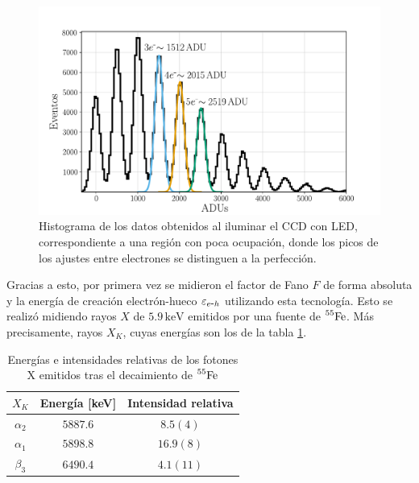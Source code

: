 \begin{figure}[H]
    \centering
        \includegraphics[scale=.5]{Figs/ajuste_gaussiano_calibracion.pdf}
    \caption{\footnotesize{Histograma de los datos obtenidos al iluminar el CCD con LED, correspondiente a una región con poca ocupación, donde los picos de los ajustes entre electrones se distinguen a la perfección.}}
    \label{fig:Calibracion}
\end{figure}
Gracias a esto, por primera vez se midieron el factor de Fano $F$ de forma absoluta y la energía de creación electrón-hueco $\varepsilon_{e\mbox{-}h}$ utilizando esta tecnología. Esto se realizó midiendo rayos $X$ de $5.9\,\si{\mbox{keV}}$ emitidos por una fuente de $\prescript{55}{}{\mbox{Fe}}$. Más precisamente, rayos $X_{K}$, cuyas energías son los de la tabla \ref{tab:EnergiasXk}.
\begin{table}[h]
\centering
\begin{tabular}{@{}ccc@{}}
\toprule
$X_{K}$         &   Energía [keV]   &   Intensidad relativa \\ \hline \hline
$\alpha_{2}$    &   $5887.6$        &   $8.5 (4)$           \\
$\alpha_{1}$    &   $5898.8$        &   $16.9 (8)$          \\
$\beta_{3}$     &   $6490.4$        &   $4.1 (11)$          \\ \bottomrule
\end{tabular}
\caption{\footnotesize{Energías e intensidades relativas de los fotones X emitidos tras el decaimiento de $\prescript{55}{}{\mbox{Fe}}$}}
\label{tab:EnergiasXk}
\end{table}
